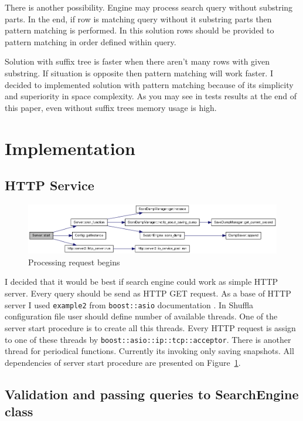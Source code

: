 \documentclass[10pt,a4paper]{article}
\begin{document}
There is another possibility. Engine may process search query without substring parts. In the end, if row is matching query without it substring parts then pattern matching is performed. In this solution rows should be provided to pattern matching in order defined within query.

Solution with suffix tree is faster when there aren't many rows with given substring. If situation is opposite then pattern matching will work faster. I decided to implemented solution with pattern matching because of its simplicity and superiority in space complexity. As you may see in tests results at the end of this paper, even without suffix trees memory usage is high. 

\section{Implementation}

\subsection{HTTP Service}

\begin{figure}
\centering
  \includegraphics[width=16cm]{start}
  \caption{Processing request begins}
  \label{fig:httpservice}
\end{figure}

I decided that it would be best if search engine could work as simple HTTP server. Every query should be send as HTTP GET request. As a base of HTTP server I used \verb|example2| from \verb|boost::asio| documentation \cite{ASIOHTTP}. In Shuffla configuration file user should define number of available threads. One of the server start procedure is to create all this threads. Every HTTP request is assign to one of these threads by \verb|boost::asio::ip::tcp::acceptor|. There is another thread for periodical functions. Currently its invoking only saving snapshots. All dependencies of server start procedure are presented on Figure~\ref{fig:httpservice}.

\subsection{Validation and passing queries to SearchEngine class}
\end{document}
